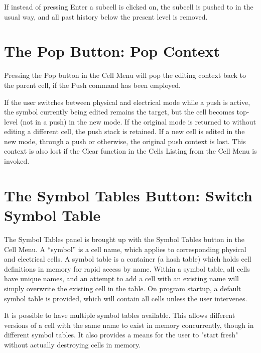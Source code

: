 If instead of pressing {\kb Enter} a subcell is clicked on, the
subcell is pushed to in the usual way, and all past history below
the present level is removed.


\section{The {\cb Pop} Button: Pop Context}
Pressing the {\cb Pop} button in the {\cb Cell Menu} will pop the
editing context back to the parent cell, if the {\cb Push} command has
been employed.

If the user switches between physical and electrical mode while a push
is active, the symbol currently being edited remains the target, but
the cell becomes top-level (not in a push) in the new mode.  If the
original mode is returned to without editing a different cell, the
push stack is retained.  If a new cell is edited in the new mode,
through a push or otherwise, the original push context is lost.  This
context is also lost if the {\cb Clear} function in the {\cb Cells
Listing} from the {\cb Cell Menu} is invoked.


\section{The {\cb Symbol Tables} Button:  Switch Symbol Table}
\label{symtab}

The {\cb Symbol Tables} panel is brought up with the {\cb Symbol
Tables} button in the {\cb Cell Menu}.  A ``symbol'' is a cell name,
which applies to corresponding physical and electrical cells.  A
symbol table is a container (a hash table) which holds cell
definitions in memory for rapid access by name.  Within a symbol
table, all cells have unique names, and an attempt to add a cell with
an existing name will simply overwrite the existing cell in the table. 
On program startup, a default symbol table is provided, which will
contain all cells unless the user intervenes.

It is possible to have multiple symbol tables available.  This allows
different versions of a cell with the same name to exist in memory
concurrently, though in different symbol tables.  It also provides a
means for the user to "start fresh" without actually destroying cells
in memory.

